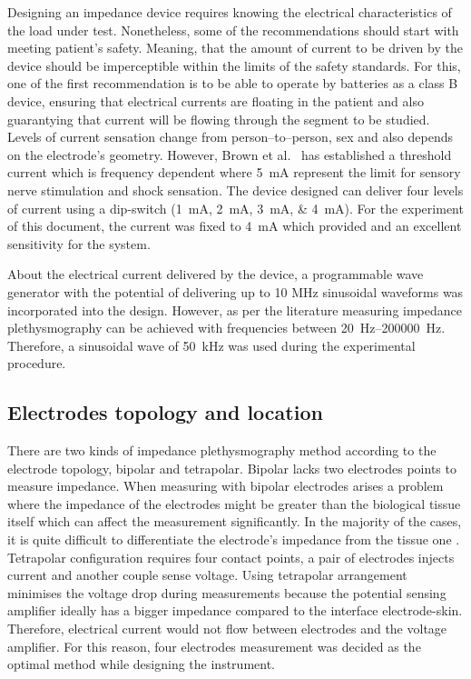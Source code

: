 Designing an impedance device requires knowing the electrical characteristics of the load under test. Nonetheless, some of the recommendations should start with meeting patient's safety. Meaning, that the amount of current to be driven by the device should be imperceptible within the limits of the safety standards. For this, one of the first recommendation is to be able to operate by batteries as a class B device, ensuring that electrical currents are floating in the patient and also guarantying that current will be flowing through the segment to be studied. Levels of current sensation change from person–to–person, sex and also depends on the electrode's geometry. However, Brown et al.~\cite{brown1998medical} has established a threshold current which is frequency dependent where \SI{5}{\mA} represent the limit for sensory nerve stimulation and shock sensation. The device designed can deliver four levels of current using a dip-switch (\SIlist{1;2;3;4}{\mA}). For the experiment of this document, the current was fixed to \SI{4}{\mA} which provided and an excellent sensitivity for the system. 

About the electrical current delivered by the device, a programmable wave generator with the potential of delivering up to 10 MHz sinusoidal waveforms was incorporated into the design. However, as per the literature measuring impedance plethysmography can be achieved with frequencies between \SIrange[scientific-notation = engineering]{20}{200000}{\hertz}. Therefore, a sinusoidal wave of \SI{50}{\kilo\hertz} was used during the experimental procedure.

\subsection{Electrodes topology and location}
There are two kinds of impedance plethysmography method according to the electrode topology, bipolar and tetrapolar. Bipolar lacks two electrodes points to measure impedance. When measuring with bipolar electrodes arises a problem where the impedance of the electrodes might be greater than the biological tissue itself which can affect the measurement significantly. In the majority of the cases, it is quite difficult to differentiate the electrode's impedance from the tissue one \cite{brown2000bipolar}. Tetrapolar configuration requires four contact points, a pair of electrodes injects current and another couple sense voltage. Using tetrapolar arrangement minimises the voltage drop during measurements because the potential sensing amplifier ideally has a bigger impedance compared to the interface electrode-skin. Therefore, electrical current would not flow between electrodes and the voltage amplifier. For this reason, four electrodes measurement was decided as the optimal method while designing the instrument. 

